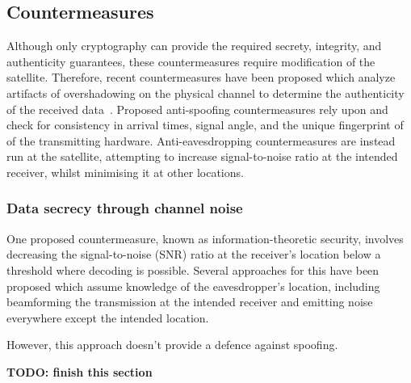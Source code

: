 \subsection{Countermeasures}

Although only cryptography can provide the required secrety, integrity, and authenticity guarantees, these countermeasures require modification of the satellite.
Therefore, recent countermeasures have been proposed which analyze artifacts of overshadowing on the physical channel to determine the authenticity of the received data~\cite{jedermann2021orbit,oligeri2020past}.
Proposed anti-spoofing countermeasures rely upon and check for consistency in arrival times, signal angle, and the unique fingerprint of of the transmitting hardware.
Anti-eavesdropping countermeasures are instead run at the satellite, attempting to increase signal-to-noise ratio at the intended receiver, whilst minimising it at other locations.

\subsubsection{Data secrecy through channel noise}

One proposed countermeasure, known as information-theoretic security, involves decreasing the signal-to-noise (SNR) ratio at the receiver's location below a threshold where decoding is possible.
Several approaches for this have been proposed which assume knowledge of the eavesdropper's location, including beamforming the transmission at the intended receiver and emitting noise everywhere except the intended location.

However, this approach doesn't provide a defence against spoofing.

\textbf{TODO: finish this section}






